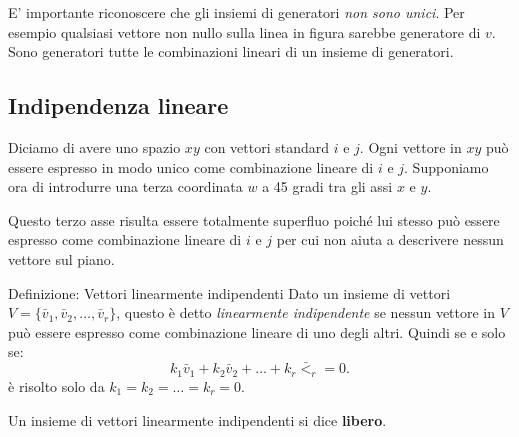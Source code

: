 \documentclass[x11names]{article}
\begin{document}
\noindent
E' importante riconoscere che gli insiemi di generatori \textit{non sono unici}. Per esempio qualsiasi vettore non nullo sulla linea in figura sarebbe generatore  di $v$. Sono generatori tutte le combinazioni lineari di un insieme di generatori.

\subsection{Indipendenza lineare}
Diciamo di avere uno spazio $xy$ con vettori standard $i$ e $j$. Ogni vettore in $xy$ può essere espresso in modo unico come combinazione lineare di $i$ e $j$. Supponiamo ora di introdurre una terza coordinata $w$ a 45 gradi tra gli assi $x$ e $y$. 

Questo terzo asse risulta essere totalmente superfluo poiché lui stesso può essere espresso come combinazione lineare di $i$ e $j$ per cui non aiuta a descrivere nessun vettore sul piano.


\begin{center}
\colorbox{myblue}{\begin{minipage}{5.75in}
\begin{blues}{Definizione: Vettori linearmente indipendenti}
Dato un insieme di vettori $V=\{\bar{v}_1,\bar{v}_2,\dots,\bar{v}_{r}\}$, questo  è detto \textit{linearmente indipendente} se nessun vettore in $V$ può essere espresso come combinazione lineare di uno degli altri. Quindi se e solo se:
\[
k_1\bar{v}_1 + k_2\bar{v}_2 + \dots + k_r\bar{<}_r = 0
.\] 
è risolto solo da $k_1 =k_2= \dots = k_r =0$.

Un insieme di vettori linearmente indipendenti si dice \textbf{libero}.
\end{blues}
\end{minipage}}        
\end{center}
\end{document}
